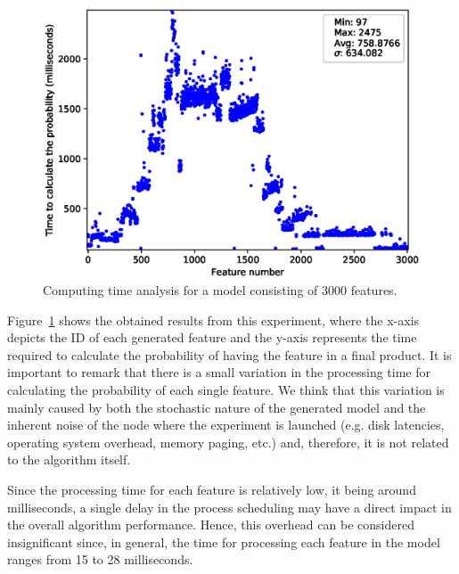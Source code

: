 \begin{figure}[h]
        \centering
        \linefigure
        \includegraphics[width=0.8\hsize,angle=0]{plot_probs_times_FeatureModel3000.eps}
        \linefigure
        \caption{Computing time analysis for a model consisting of 3000 features.}\label{fig:plot:probs:times}
\end{figure}

Figure~\ref{fig:plot:probs:times} shows the obtained
results from this experiment, where the x-axis depicts
the ID of each generated feature and the y-axis represents
the time required to calculate the probability of having the feature in a final product.
It is important to remark that there is a small variation in the processing time for
calculating the probability of each single feature. We think that this variation is
mainly caused by both the stochastic nature of the generated model and the
inherent noise of the node where the experiment is launched (e.g. disk latencies, operating
system overhead, memory paging, etc.) and, therefore, it is not related to the algorithm itself.

Since the processing time for each feature is relatively low, it being around milliseconds, a single delay in
the process scheduling may have a direct impact in the overall algorithm performance. Hence, this overhead
can be considered insignificant since, in general, the time for processing each feature in the model ranges
from 15 to 28 milliseconds.

